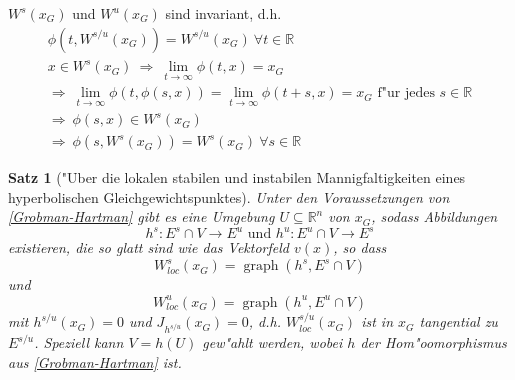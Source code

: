 \documentclass[a4paper, 13pt]{scrreprt}
\newtheorem{satz}{Satz}[section]
\theoremstyle{definition} \newtheorem{definition}{Definition}[section]
\newenvironment{bemerkung}[1][Bemerkung]{\begin{trivlist}
\item[\hskip \labelsep {\bfseries #1}]}{\end{trivlist}}
\newcommand{\RR}{\mathbb{R}}
\begin{document}
\begin{bemerkung}
$W^s(x_G)$ und $W^u(x_G)$ sind invariant, d.h.
\begin{align*}
\phi(t,W^{s/u}(x_G))=W^{s/u}(x_G)\ \forall t\in\mathbb{R} \\
x\in W^s(x_G)\ \Rightarrow\ \lim_{t\to\infty}\phi(t,x)=x_G\\
\Rightarrow\ \lim_{t\to\infty}\phi(t,\phi(s,x))=\lim_{t\to\infty}\phi(t+s,x)=x_G \text{ f"ur jedes }  s\in\mathbb{R}\\
\Rightarrow\ \phi(s,x)\in W^s(x_G)\\
\Rightarrow\ \phi(s,W^s(x_G))=W^s(x_G)\ \forall s\in\mathbb{R}
\end{align*}
\end{bemerkung}

\begin{satz}["Uber die lokalen stabilen und instabilen Mannigfaltigkeiten eines hyperbolischen Gleichgewichtspunktes]
Unter den Voraussetzungen von \eqref{Grobman-Hartman} gibt es eine Umgebung $U\subseteq \RR^n$ von $x_G$, sodass  Abbildungen
\[h^s:E^s\cap V\to E^u \text{ und } h^u:E^u\cap V\to E^s\]
existieren, die so glatt sind wie das Vektorfeld $v(x)$, so dass
\[W_{loc}^s(x_G)=\operatorname{graph}(h^s, E^s\cap V) \]und
\[W_{loc}^u(x_G)=\operatorname{graph}(h^u, E^u\cap V) \]
mit $h^{s/u}(x_G)=0$ und $J_{h^{s/u}}(x_G)=0$, d.h. $W_{loc}^{s/u}(x_G)$ ist in $x_G$ tangential zu $E^{s/u}$. Speziell kann $V = h(U)$ gew"ahlt werden, wobei $h$ der Hom"oomorphismus aus \eqref{Grobman-Hartman} ist.
\end{satz}
\end{document}
